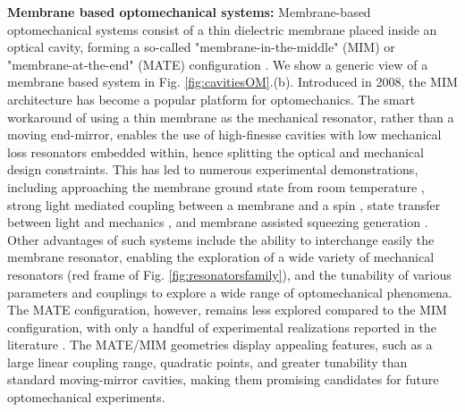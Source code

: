 \noindent \textbf{Membrane based optomechanical systems:} Membrane-based optomechanical systems consist of a thin dielectric membrane placed inside an optical cavity, forming a so-called "membrane-in-the-middle" (MIM) or "membrane-at-the-end" (MATE) configuration \cite{Thompson2008Nature,Jayich2008NJP}. We show a generic view of a membrane based system in Fig. \ref{fig:cavitiesOM}.(b). Introduced in 2008, the MIM architecture has become a popular platform for optomechanics. The smart workaround of using a thin membrane as the mechanical resonator, rather than a moving end-mirror, enables the use of high-finesse cavities with low mechanical loss resonators embedded within, hence splitting the optical and mechanical design constraints. This has led to numerous experimental demonstrations, including approaching the membrane ground state from room temperature \cite{Saarinen23}, strong light mediated coupling between a membrane and a spin \cite{science.abb0328}, state transfer between light and mechanics \cite{PhysRevLett.132.100802}, and membrane assisted squeezing generation \cite{PhysRevX.3.031012, Kippenberg_2024}. Other advantages of such systems include the ability to interchange easily the membrane resonator, enabling the exploration of a wide variety of mechanical resonators (red frame of Fig. \ref{fig:resonatorsfamily}), and the tunability of various parameters and couplings to explore a wide range of optomechanical phenomena. \\

The MATE configuration, however, remains less explored compared to the MIM configuration, with only a handful of experimental realizations reported in the literature \cite{Dumont:19}. The MATE/MIM geometries display appealing features, such as a large linear coupling range, quadratic points, and greater tunability than standard moving-mirror cavities, making them promising candidates for future optomechanical experiments. \\

